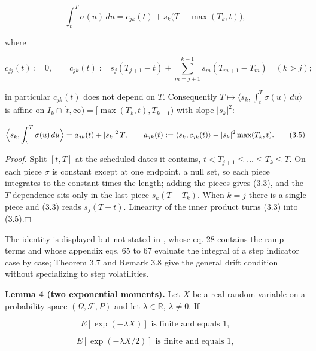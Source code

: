 \documentclass[11pt]{article}
\providecommand{\square}{\mdlgwhtsquare}
\begin{document}
\begin{equation*}
\int_t^T \sigma(u)\,du = c_{jk}(t) + s_k \bigl( T - \max(T_k, t) \bigr), \tag{3.3}\label{eq:3.3}
\end{equation*}

where

\begin{equation*}
c_{jj}(t) := 0, \qquad c_{jk}(t) := s_j (T_{j+1} - t) + \sum_{m=j+1}^{k-1} s_m (T_{m+1} - T_m) \quad (k > j); \tag{3.4}\label{eq:3.4}
\end{equation*}

in particular \(c_{jk}(t)\) does not depend on \(T\). Consequently \(T \mapsto \langle s_k, \int_t^T \sigma(u)\,du \rangle\) is affine on \(I_k \cap [t, \infty) = [\max(T_k, t), T_{k+1})\) with slope \(|s_k|^2\):

\begin{equation*}
\Bigl\langle s_k, \int_t^T \sigma(u)\,du \Bigr\rangle = a_{jk}(t) + |s_k|^2\, T, \qquad a_{jk}(t) := \langle s_k, c_{jk}(t) \rangle - |s_k|^2 \max(T_k, t). \tag{3.5}\label{eq:3.5}
\end{equation*}

\emph{Proof.} Split \([t, T]\) at the scheduled dates it contains, \(t < T_{j+1} \le \dots \le T_k \le T\). On each piece \(\sigma\) is constant except at one endpoint, a null set, so each piece integrates to the constant times the length; adding the pieces gives (3.3), and the \(T\)-dependence sits only in the last piece \(s_k (T - T_k)\). When \(k = j\) there is a single piece and (3.3) reads \(s_j (T - t)\). Linearity of the inner product turns (3.3) into (3.5).\hfill$\square$

The identity is displayed but not stated in \cite{gellert2021short}, whose eq. 28 contains the ramp terms and whose appendix eqs. 65 to 67 evaluate the integral of a step indicator case by case; \cite{fontana2018term} Theorem 3.7 and Remark 3.8 give the general drift condition without specializing to step volatilities.

\label{res:Lemma-4}
\textbf{Lemma 4 (two exponential moments).} Let \(X\) be a real random variable on a probability space \((\Omega, \mathcal F, P)\) and let \(\lambda \in \mathbb R\), \(\lambda \ne 0\). If

\begin{equation*}
E[\exp(-\lambda X)] \text{ is finite and equals } 1, \tag{3.6}\label{eq:3.6}
\end{equation*}

\begin{equation*}
E[\exp(-\lambda X / 2)] \text{ is finite and equals } 1, \tag{3.7}\label{eq:3.7}
\end{equation*}
\end{document}

